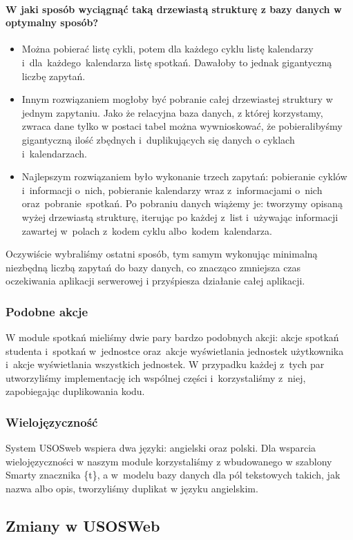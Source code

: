 \documentclass[licencjacka]{pracamgr}
\begin{document}
\paragraph{W jaki sposób wyciągnąć taką drzewiastą strukturę z bazy danych w optymalny sposób?}
\begin{itemize}
  \item
  Można pobierać listę cykli, potem dla każdego cyklu listę kalendarzy i~dla~każdego~kalendarza listę spotkań. Dawałoby to jednak gigantyczną liczbę zapytań.
  \item
  Innym rozwiązaniem mogłoby być pobranie całej drzewiastej struktury w jednym zapytaniu. Jako że relacyjna baza danych, z której korzystamy, zwraca dane tylko w postaci tabel można wywnioskować, że pobieralibyśmy gigantyczną ilość zbędnych i~duplikujących się danych o cyklach i~kalendarzach.
  \item
  Najlepszym rozwiązaniem było wykonanie trzech zapytań: pobieranie cyklów i~informacji o~nich, pobieranie kalendarzy wraz z~informacjami o~nich oraz~pobranie~spotkań. Po pobraniu danych wiążemy je: tworzymy opisaną wyżej drzewiastą strukturę, iterując po każdej z~list i~używając informacji zawartej w~polach z~kodem cyklu albo~kodem~kalendarza.
\end{itemize}
Oczywiście wybraliśmy ostatni sposób, tym samym wykonując minimalną niezbędną liczbą zapytań do bazy danych, co znacząco zmniejsza czas oczekiwania aplikacji serwerowej i przyśpiesza działanie całej aplikacji.

\subsubsection{Podobne akcje}
W module spotkań mieliśmy dwie pary bardzo podobnych akcji: akcje spotkań studenta i~spotkań w~jednostce oraz~akcje wyświetlania jednostek użytkownika i~akcje wyświetlania wszystkich jednostek. W przypadku każdej z~tych par utworzyliśmy implementację ich wspólnej części i~korzystaliśmy z~niej, zapobiegając duplikowania kodu.
\subsubsection{Wielojęzyczność}
System USOSweb wspiera dwa języki: angielski oraz polski. Dla wsparcia wielojęzyczności w naszym module korzystaliśmy z wbudowanego w szablony Smarty znacznika \{t\}, a w~modelu bazy danych dla pól tekstowych takich, jak nazwa albo opis, tworzyliśmy duplikat w języku angielskim.
\subsection{Zmiany w USOSWeb}
\end{document}
